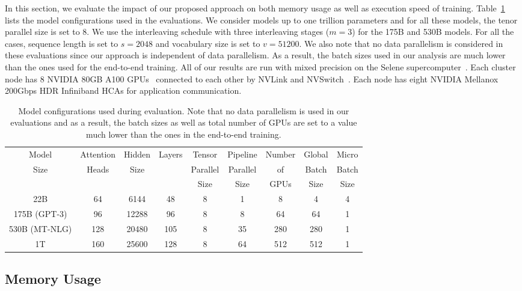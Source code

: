 \documentclass{article}
\begin{document}
In this section, we evaluate the impact of our proposed approach on both memory usage as well as execution speed of training. Table~\ref{tab:configs} lists the model configurations used in the evaluations. We consider models up to one trillion parameters and for all these models, the tenor parallel size is set to 8. We use the interleaving schedule with three interleaving stages ($m=3$) for the 175B and 530B models. For all the cases, sequence length is set to $s=2048$ and vocabulary size is set to $v=51200$. We also note that no data parallelism is considered in these evaluations since our approach is independent of data parallelism. As a result, the batch sizes used in our analysis are much lower than the ones used for the end-to-end training. All of our results are run with mixed precision on the Selene supercomputer~\cite{selene}. Each cluster node has 8 NVIDIA 80GB A100 GPUs~\cite{a100} connected to each other by NVLink and NVSwitch~\cite{nvlink}. Each node has eight NVIDIA Mellanox 200Gbps HDR Infiniband HCAs for application communication.

\begin{table}
    \centering
    \begin{tabular}{c|c|c|c|c|c|c|c|c}
        Model & Attention & Hidden & \multirow{3}{*}{Layers} & Tensor        & Pipeline      & Number & Global      & Micro   \\
                           Size   & Heads     & Size   &                         & Parallel & Parallel & of & Batch & Batch \\
                           & & & & Size & Size & GPUs & Size & Size \\
        \hline
        22B  & 64  & 6144  & 48  & 8 & 1 & 8 & 4   & 4  \\
        175B (GPT-3) & 96  & 12288 & 96  & 8 & 8 & 64  & 64  & 1\\
        530B (MT-NLG) & 128 & 20480 & 105 & 8 & 35 & 280 & 280 & 1\\
        1T   & 160 & 25600 & 128 & 8 & 64 & 512 & 512  & 1 \\
    \end{tabular}
    \caption{Model configurations used during evaluation. Note that no data parallelism is used in our evaluations and as a result, the batch sizes as well as total number of GPUs are set to a value much lower than the ones in the end-to-end training.}
    \label{tab:configs}
\end{table}

\subsection{Memory Usage}
\label{sec:memory-usage}
\end{document}
